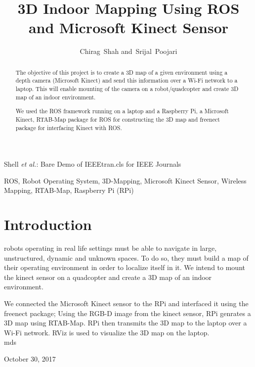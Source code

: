 \documentclass[journal]{IEEEtran}
\begin{document}
\title{3D Indoor Mapping Using ROS and Microsoft Kinect Sensor}
\author{Chirag~Shah
        and~Srijal~Poojari}%
%
{Shell \MakeLowercase{\textit{et al.}}: Bare Demo of IEEEtran.cls for IEEE Journals}

\maketitle
\begin{abstract}
The objective of this project is to create a 3D map of a given environment using a depth camera (Microsoft Kinect) and send this information over a Wi-Fi network to a laptop. This will enable mounting of the camera on a robot/quadcopter and create 3D  map of an indoor environment.

We used the ROS framework running on a laptop and a Raspberry Pi, a Microsoft Kinect, RTAB-Map package for ROS for constructing the 3D map and freenect package for interfacing Kinect with ROS.
\end{abstract}

\begin{IEEEkeywords}
ROS, Robot Operating System, 3D-Mapping, Microsoft Kinect Sensor, Wireless Mapping, RTAB-Map, Raspberry Pi (RPi)
\end{IEEEkeywords}

\section{Introduction}
 robots operating in real life settings must be able to navigate in large, unstructured, dynamic and unknown spaces. To do so, they must build a map of their operating environment in order to localize itself in it. We intend to mount the kinect sensor on a quadcopter and create a 3D map of an indoor environment.

We connected the Microsoft Kinect sensor to the RPi and interfaced it using the freenect package; Using the RGB-D image from the kinect sensor, RPi genrates a 3D map using RTAB-Map. RPi then transmits the 3D map to the laptop over a Wi-Fi network. RViz is used to visualize the 3D map on the laptop.
\\

\hfill mds
 
\hfill October 30, 2017

\end{document}
